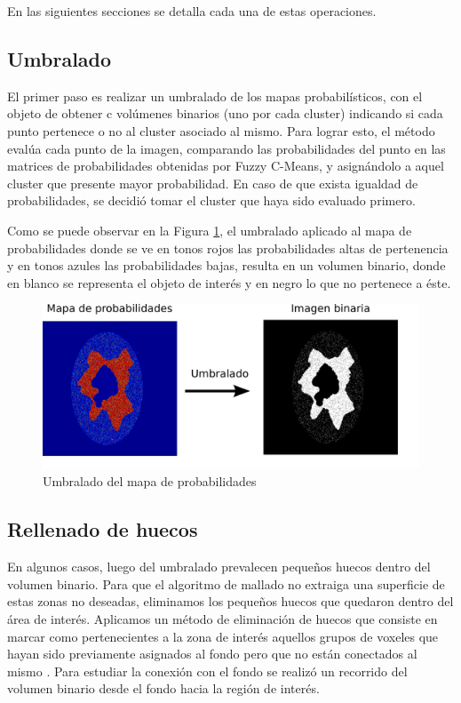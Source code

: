 En las siguientes secciones se detalla cada una de estas operaciones.

\subsection{Umbralado}\label{section:umbralado}
El primer paso es realizar un umbralado de los mapas probabilísticos, con el objeto de obtener c volúmenes binarios (uno por cada cluster) indicando si cada punto pertenece o no al cluster asociado al mismo. Para lograr esto, el método evalúa cada punto de la imagen, comparando las probabilidades del punto en las matrices de probabilidades obtenidas por Fuzzy C-Means, y asignándolo a aquel cluster que presente mayor probabilidad. En caso de que exista igualdad de probabilidades, se decidió tomar el cluster que haya sido evaluado primero.

Como se puede observar en la Figura \ref{fig:umbralado}, el umbralado aplicado al mapa de probabilidades donde se ve en tonos rojos las probabilidades altas de pertenencia y en tonos azules las probabilidades bajas, resulta en un volumen binario, donde en blanco se representa el objeto de interés y en negro lo que no pertenece a éste.

\begin{figure}[H]
	\centering
	\includegraphics[scale=0.3]{images/umbralado.png}
	\caption{Umbralado del mapa de probabilidades}
	\label{fig:umbralado}
\end{figure}


\subsection{Rellenado de huecos}
En algunos casos, luego del umbralado prevalecen pequeños huecos dentro del volumen binario. Para que el algoritmo de mallado no extraiga una superficie de estas zonas no deseadas, eliminamos los pequeños huecos que quedaron dentro del área de interés. Aplicamos un método de eliminación de huecos que consiste en marcar como pertenecientes a la zona de interés aquellos grupos de voxeles que hayan sido previamente asignados al fondo pero que no están conectados al mismo \citep{soille2003morphological}. Para estudiar la conexión con el fondo se realizó un recorrido del volumen binario desde el fondo hacia la región de interés.

